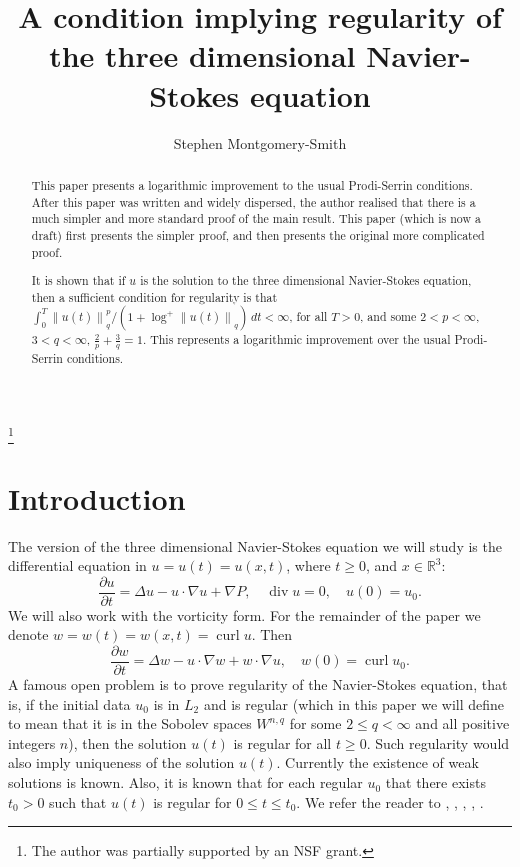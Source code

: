 \documentclass[12pt]{amsart}
\theoremstyle{remark}
\newcommand{\R}{{\mathbb R}}
\newcommand{\snormo}[1]{{\mathopen\|#1\mathclose\|}}
\DeclareMathOperator{\curl}{curl}
\DeclareMathOperator{\divergence}{div}
\begin{document}
\title[Regularity of Navier-Stokes]
{A condition implying regularity of the three dimensional Navier-Stokes
equation}
\author{Stephen Montgomery-Smith}
\makeatletter
\address{Department of Mathematics,
University of Missouri,
Columbia, MO 65211}
\thanks{The author was
partially supported
by an NSF grant.}

\begin{abstract}
This paper presents a logarithmic improvement to the usual Prodi-Serrin
conditions.  After this paper was written and widely dispersed, the
author realised that there is a much simpler and more standard
proof of the main result.
This paper (which is now a draft) first presents the simpler proof,
and then presents the original more complicated proof.

It is shown that if $u$ is the solution to the
three dimensional Navier-Stokes equation, then a sufficient condition
for regularity is that 
$\int_0^T {\snormo{u(t)}_q^p}/{(1+\log^+ \snormo{u(t)}_q)}
 \, dt < \infty $,
for all $T>0$, and some
$2 < p < \infty$, $3 < q < \infty$,
$\frac2p+\frac3q=1$.  This represents a logarithmic
improvement over the usual Prodi-Serrin conditions.
\end{abstract}

\maketitle

\section{Introduction}

The version of the three dimensional
Navier-Stokes equation we will study is the
differential equation in
$u = u(t) = u(x,t)$, where $ t\ge 0$, and $x \in \R^3$:
$$ \frac{\partial u}{\partial t}
   = \Delta u - u \cdot \nabla u + \nabla P ,
   \quad \divergence u = 0 ,
   \quad u(0) = u_0.$$
We will also work with the vorticity form.  For the remainder of the paper
we denote $w = w(t) = w(x,t) = \curl u$.
Then
$$ \frac{\partial w}{\partial t}
   = \Delta w - u \cdot \nabla w + w \cdot \nabla u ,
   \quad w(0) = \curl u_0 .$$
A famous open problem is to prove regularity of the Navier-Stokes
equation, that is, if the initial data $u_0$ is in $L_2$ and is
regular (which in this paper we will define to mean that it is
in the Sobolev spaces $W^{n,q}$ for some $2\le q<\infty$ and all positive
integers $n$), then the solution $u(t)$ is regular for all
$t\ge0$.  Such regularity would also imply uniqueness of the solution
$u(t)$.  Currently the existence of weak solutions is known.
Also, it is known that for each regular $u_0$ that there exists
$t_0>0$ such that $u(t)$ is regular for $0\le t \le t_0$.
We refer the reader to 
\cite{cannone}, \cite{constantin-foias}, \cite{doering-gibbons},
\cite{lemarie-rieusset}, \cite{temam}.
\end{document}
